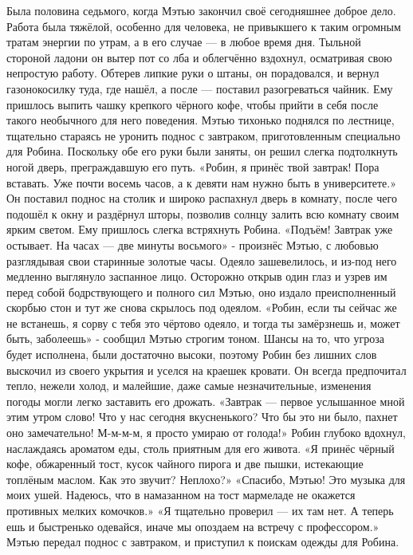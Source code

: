 \documentclass[a4paper,12pt]{book}
\begin{document}
	Была половина седьмого, когда Мэтью закончил своё сегодняшнее доброе дело. Работа была тяжёлой, особенно для человека, не привыкшего к таким огромным тратам энергии по утрам, а в его случае — в любое время дня. Тыльной стороной ладони он вытер пот со лба и облегчённо вздохнул, осматривая свою непростую работу. Обтерев липкие руки о штаны, он порадовался, и вернул газонокосилку туда, где нашёл, а после — поставил разогреваться чайник. Ему пришлось выпить чашку крепкого чёрного кофе, чтобы прийти в себя после такого необычного для него поведения.
	Мэтью тихонько поднялся по лестнице, тщательно стараясь не уронить поднос с завтраком, приготовленным специально для Робина. Поскольку обе его руки были заняты, он решил слегка подтолкнуть ногой дверь, преграждавшую его путь.
	«Робин, я принёс твой завтрак! Пора вставать. Уже почти восемь часов, а к девяти нам нужно быть в университете.»
	Он поставил поднос на столик и широко распахнул дверь в комнату, после чего подошёл к окну и раздёрнул шторы, позволив солнцу залить всю комнату своим ярким светом.
	Ему пришлось слегка встряхнуть Робина.
	«Подъём! Завтрак уже остывает. На часах — две минуты восьмого» - произнёс Мэтью, с любовью разглядывая свои старинные золотые часы. Одеяло зашевелилось, и из-под него медленно выглянуло заспанное лицо. Осторожно открыв один глаз и узрев им перед собой бодрствующего и полного сил Мэтью, оно издало преисполненный скорбью стон и тут же снова скрылось под одеялом. 
	«Робин, если ты сейчас же не встанешь, я сорву с тебя это чёртово одеяло, и тогда ты замёрзнешь и, может быть, заболеешь» - сообщил Мэтью строгим тоном. Шансы на то, что угроза будет исполнена, были достаточно высоки, поэтому Робин без лишних слов выскочил из своего укрытия и уселся на краешек кровати. Он всегда предпочитал тепло, нежели холод, и малейшие, даже самые незначительные, изменения погоды могли легко заставить его дрожать.
	«Завтрак — первое услышанное мной этим утром слово! Что у нас сегодня вкусненького? Что бы это ни было, пахнет оно замечательно! М-м-м-м, я просто умираю от голода!»
	Робин глубоко вдохнул, наслаждаясь ароматом еды, столь приятным для его живота.
	«Я принёс чёрный кофе, обжаренный тост, кусок чайного пирога и две пышки, истекающие топлёным маслом. Как это звучит? Неплохо?»
	«Спасибо, Мэтью! Это музыка для моих ушей. Надеюсь, что в намазанном на тост мармеладе не окажется противных мелких комочков.»
	«Я тщательно проверил — их там нет. А теперь ешь и быстренько одевайся, иначе мы опоздаем на встречу с профессором.»
	Мэтью передал поднос с завтраком, и приступил к поискам одежды для Робина.
\end{document}
